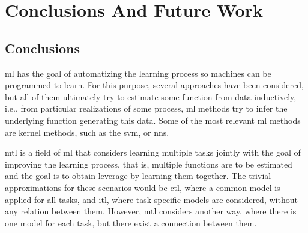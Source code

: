
\chapter{Conclusions And Future Work} %
\label{ChapterConclusions}

\section{Conclusions}
%
\acrfull{ml} has the goal of automatizing the learning process so machines can be programmed to learn. For this purpose, several approaches have been considered, but all of them ultimately try to estimate some function from data inductively, i.e., from particular realizations of some process, \acrshort{ml} methods try to infer the underlying function generating this data. Some of the most relevant \acrshort{ml} methods are kernel methods, such as the \acrfull{svm}, or \acrfull{nns}.

\acrfull{mtl} is a field of \acrshort{ml} that considers learning multiple tasks jointly with the goal of improving the learning process, that is, multiple functions are to be estimated and the goal is to obtain leverage by learning them together. The trivial approximations for these scenarios would be \acrfull{ctl}, where a common model is applied for all tasks, and \acrfull{itl}, where task-specific models are considered, without any relation between them. However, \acrshort{mtl} considers another way, where there is one model for each task, but there exist a connection between them.

